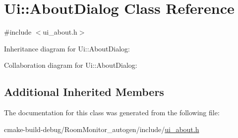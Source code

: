 \hypertarget{class_ui_1_1_about_dialog}{}\section{Ui\+:\+:About\+Dialog Class Reference}
\label{class_ui_1_1_about_dialog}


{\ttfamily \#include $<$ui\+\_\+about.\+h$>$}



Inheritance diagram for Ui\+:\+:About\+Dialog\+:


Collaboration diagram for Ui\+:\+:About\+Dialog\+:
\subsection*{Additional Inherited Members}


The documentation for this class was generated from the following file\+:\begin{DoxyCompactItemize}
\item 
cmake-\/build-\/debug/\+Room\+Monitor\+\_\+autogen/include/\hyperlink{ui__about_8h}{ui\+\_\+about.\+h}\end{DoxyCompactItemize}
